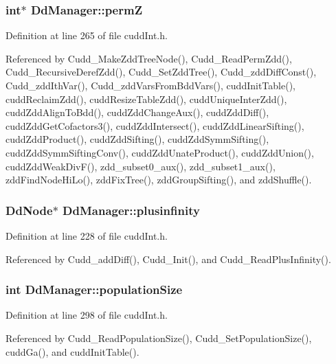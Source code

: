 \subsubsection{\setlength{\rightskip}{0pt plus 5cm}int$\ast$ \bf{Dd\-Manager::perm\-Z}}\label{structDdManager_a87aa500f809bac20002480f2cc7c2d8}




Definition at line 265 of file cudd\-Int.h.

Referenced by Cudd\_\-Make\-Zdd\-Tree\-Node(), Cudd\_\-Read\-Perm\-Zdd(), Cudd\_\-Recursive\-Deref\-Zdd(), Cudd\_\-Set\-Zdd\-Tree(), Cudd\_\-zdd\-Diff\-Const(), Cudd\_\-zdd\-Ith\-Var(), Cudd\_\-zdd\-Vars\-From\-Bdd\-Vars(), cudd\-Init\-Table(), cudd\-Reclaim\-Zdd(), cudd\-Resize\-Table\-Zdd(), cudd\-Unique\-Inter\-Zdd(), cudd\-Zdd\-Align\-To\-Bdd(), cudd\-Zdd\-Change\-Aux(), cudd\-Zdd\-Diff(), cudd\-Zdd\-Get\-Cofactors3(), cudd\-Zdd\-Intersect(), cudd\-Zdd\-Linear\-Sifting(), cudd\-Zdd\-Product(), cudd\-Zdd\-Sifting(), cudd\-Zdd\-Symm\-Sifting(), cudd\-Zdd\-Symm\-Sifting\-Conv(), cudd\-Zdd\-Unate\-Product(), cudd\-Zdd\-Union(), cudd\-Zdd\-Weak\-Div\-F(), zdd\_\-subset0\_\-aux(), zdd\_\-subset1\_\-aux(), zdd\-Find\-Node\-Hi\-Lo(), zdd\-Fix\-Tree(), zdd\-Group\-Sifting(), and zdd\-Shuffle().
\subsubsection{\setlength{\rightskip}{0pt plus 5cm}\bf{Dd\-Node}$\ast$ \bf{Dd\-Manager::plusinfinity}}\label{structDdManager_5b46c8afca21069beb3b5f4b27e0196a}




Definition at line 228 of file cudd\-Int.h.

Referenced by Cudd\_\-add\-Diff(), Cudd\_\-Init(), and Cudd\_\-Read\-Plus\-Infinity().
\subsubsection{\setlength{\rightskip}{0pt plus 5cm}int \bf{Dd\-Manager::population\-Size}}\label{structDdManager_66eb055276b611db6849baf52f8766ef}




Definition at line 298 of file cudd\-Int.h.

Referenced by Cudd\_\-Read\-Population\-Size(), Cudd\_\-Set\-Population\-Size(), cudd\-Ga(), and cudd\-Init\-Table().

